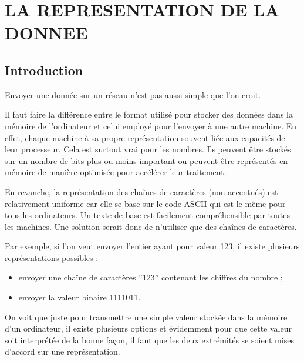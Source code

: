 \chapter{LA REPRESENTATION DE LA DONNEE}

\section{Introduction}
     \vspace{1em}

Envoyer une donnée sur un réseau n’est pas aussi simple que l’on croit.
     \vspace{1em}

 \begin{figure}
\end{figure}
Il faut faire la différence entre le format utilisé pour stocker des données dans la mémoire de l'ordinateur et celui employé pour l'envoyer à une autre machine. En effet, chaque machine à sa propre représentation souvent liée aux capacités de leur processeur. Cela est surtout vrai pour les nombres. Ils peuvent être stockés sur un nombre de bits plus ou moins important ou peuvent être représentés en mémoire de manière optimisée pour accélérer leur traitement. 

En revanche, la représentation des chaînes de caractères (non accentués) est relativement uniforme car elle se base sur le code ASCII qui est le même pour tous les ordinateurs. Un texte de base est facilement compréhensible par toutes les machines. Une solution serait donc de n'utiliser que des chaînes de caractères. 

     \vspace{1em}

Par exemple, si l’on veut envoyer l'entier ayant pour valeur 123, il existe plusieurs représentations possibles :
\begin{itemize}
\item envoyer une chaîne de caractères ”123” contenant les chiffres du nombre ;
\item envoyer la valeur binaire 1111011.
\end{itemize}

     \vspace{1em}

On voit que juste pour transmettre une simple valeur stockée dans la mémoire d'un ordinateur, il existe plusieurs options et évidemment pour que cette valeur soit interprétée de la bonne façon, il faut que les deux extrémités se soient mises d'accord sur une représentation.

